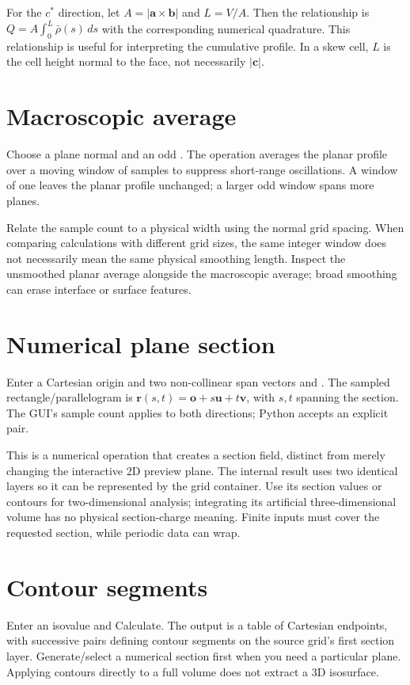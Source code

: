 For the $c^*$ direction, let $A=|\mathbf a\times\mathbf b|$ and $L=V/A$. Then the relationship is $Q=A\int_0^L\bar\rho(s)\,ds$ with the corresponding numerical quadrature. This relationship is useful for interpreting the cumulative profile. In a skew cell, $L$ is the cell height normal to the face, not necessarily $|\mathbf c|$.

\section{Macroscopic average}
Choose a plane normal and an odd . The operation averages the planar profile over a moving window of samples to suppress short-range oscillations. A window of one leaves the planar profile unchanged; a larger odd window spans more planes.

Relate the sample count to a physical width using the normal grid spacing. When comparing calculations with different grid sizes, the same integer window does not necessarily mean the same physical smoothing length. Inspect the unsmoothed planar average alongside the macroscopic average; broad smoothing can erase interface or surface features.

\section{Numerical plane section}
Enter a Cartesian origin and two non-collinear span vectors  and . The sampled rectangle/parallelogram is $\mathbf r(s,t)=\mathbf o+s\mathbf u+t\mathbf v$, with $s,t$ spanning the section. The GUI's sample count applies to both directions; Python accepts an explicit pair.

This is a numerical operation that creates a section field, distinct from merely changing the interactive 2D preview plane. The internal result uses two identical layers so it can be represented by the grid container. Use its section values or contours for two-dimensional analysis; integrating its artificial three-dimensional volume has no physical section-charge meaning. Finite inputs must cover the requested section, while periodic data can wrap.

\section{Contour segments}
Enter an isovalue and Calculate. The output is a table of Cartesian endpoints, with successive pairs defining contour segments on the source grid's first section layer. Generate/select a numerical section first when you need a particular plane. Applying contours directly to a full volume does not extract a 3D isosurface.

